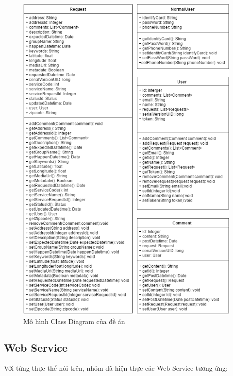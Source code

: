 \documentclass[a4paper]{article}
\begin{document}
\newpage
\begin{center}
    \begin{figure}[h]
    \begin{center}
     \includegraphics[scale=.6]{class-diagram.png}
    \end{center}
    \caption{Mô hình Class Diagram của đề án}
    \label{refhinh1}
    \end{figure}
\end{center}
\newpage
\subsection{Web Service}
Với từng thực thể nói trên, nhóm đã hiện thực các Web Service tương ứng:
\end{document}
